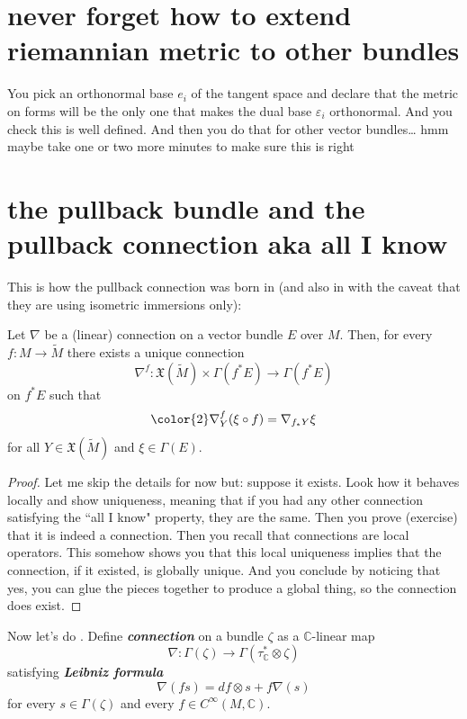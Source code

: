 \section{never forget how to extend riemannian metric to other bundles}

You pick an orthonormal base \(e_i\) of the tangent space and declare that the metric on forms will be the only one that makes the dual base \(\varepsilon_i\) orthonormal. And you check this is well defined. And then you do that for other vector bundles… hmm maybe take one or two more minutes to make sure this is right

\section{the pullback bundle and the pullback connection aka all I know}

This is how the pullback connection was born in \cite{au} (and also in \cite{daj} with the caveat that they are using isometric immersions only):

\begin{prop}\leavevmode
Let \(\nabla\) be a (linear) connection on a vector bundle \(E\) over \(M\). Then, for every \(f:M \to \widetilde{M}\) there exists a unique connection
\[\nabla^f:\mathfrak{X}(\widetilde{M}) \times \Gamma(f^*E) \longrightarrow \Gamma(f^*E)\]
on \(f^*E\) such that
\[{\color{2}\nabla^f_Y(\xi \circ f)=\nabla_{f_* Y}\xi}\]
for all \(Y \in \mathfrak{X}(\widetilde{M})\) and \(\xi \in \Gamma(E)\).
\end{prop}

\begin{proof}\leavevmode
Let me skip the details for now but: suppose it exists. Look how it behaves locally and show uniqueness, meaning that if you had any other connection satisfying the ``all I know" property, they are the same. Then you prove (exercise) that it is indeed a connection. Then you recall that connections are local operators. This somehow shows you that this local uniqueness implies that the connection, if it existed, is globally unique. And you conclude by noticing that yes, you can glue the pieces together to produce a global thing, so the connection does exist.
\end{proof}

Now let's do \cite{mc}. Define \textit{\textbf{connection}} on a bundle \(\zeta\) as a \(\mathbb{C}\)-linear map
\[\nabla:\Gamma(\zeta) \longrightarrow \Gamma(\tau_{\mathbb{C}}^* \otimes \zeta)\]
satisfying \textit{\textbf{Leibniz formula}} 
\[\nabla(fs)=df \otimes s +f \nabla(s)\]
for every \(s \in \Gamma(\zeta)\) and every \(f \in C^\infty(M,\mathbb{C})\).

